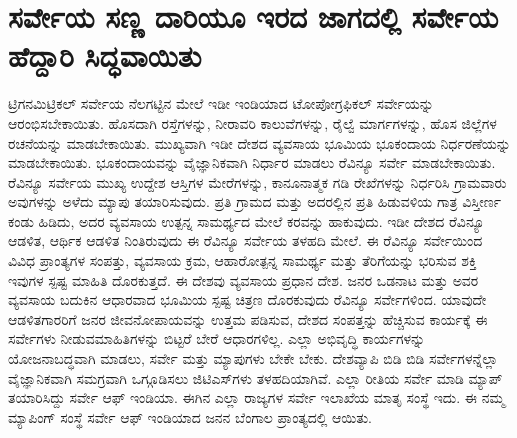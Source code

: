 
\chapter{ಸರ್ವೇಯ ಸಣ್ಣ ದಾರಿಯೂ ಇರದ ಜಾಗದಲ್ಲಿ ಸರ್ವೇಯ ಹೆದ್ದಾರಿ ಸಿದ್ಧವಾಯಿತು}

ಟ್ರಿಗನಮಿಟ್ರಿಕಲ್​ ಸರ್ವೇಯ ನೆಲಗಟ್ಟಿನ ಮೇಲೆ ಇಡೀ ಇಂಡಿಯಾದ ಟೋಪೋಗ್ರಫಿಕಲ್​ ಸರ್ವೇಯನ್ನು ಆರಂಭಿಸಬೇಕಾಯಿತು. ಹೊಸದಾಗಿ ರಸ್ತೆಗಳನ್ನು, ನೀರಾವರಿ ಕಾಲುವೆಗಳನ್ನು, ರೈಲ್ವೆ ಮಾರ್ಗಗಳನ್ನು, ಹೊಸ ಜಿಲ್ಲೆಗಳ ರಚನೆಯನ್ನು ಮಾಡಬೇಕಾಯಿತು. ಮುಖ್ಯವಾಗಿ ಇಡೀ ದೇಶದ ವ್ಯವಸಾಯ ಭೂಮಿಯ ಭೂಕಂದಾಯ ನಿರ್ಧರಣೆಯನ್ನು ಮಾಡಬೇಕಾಯಿತು. ಭೂಕಂದಾಯವನ್ನು ವೈಜ್ಞಾನಿಕವಾಗಿ ನಿರ್ಧಾರ ಮಾಡಲು ರೆವಿನ್ಯೂ ಸರ್ವೇ ಮಾಡಬೇಕಾಯಿತು. ರೆವಿನ್ಯೂ ಸರ್ವೇಯ ಮುಖ್ಯ ಉದ್ದೇಶ ಆಸ್ತಿಗಳ ಮೇರೆಗಳನ್ನು, ಕಾನೂನಾತ್ಮಕ ಗಡಿ ರೇಖೆಗಳನ್ನು ನಿರ್ಧರಿಸಿ ಗ್ರಾಮವಾರು ಅವುಗಳನ್ನು ಅಳೆದು ಮ್ಯಾಪು ತಯಾರಿಸುವುದು. ಪ್ರತಿ ಗ್ರಾಮದ ಮತ್ತು ಅದರಲ್ಲಿನ ಪ್ರತಿ ಹಿಡುವಳಿಯ ಗಾತ್ರ ವಿಸ್ತೀರ್ಣ ಕಂಡು ಹಿಡಿದು, ಅದರ ವ್ಯವಸಾಯ ಉತ್ಪನ್ನ ಸಾಮರ್ಥ್ಯದ ಮೇಲೆ ಕರವನ್ನು ಹಾಕುವುದು. ಇಡೀ ದೇಶದ ರೆವಿನ್ಯೂ ಆಡಳಿತ, ಆರ್ಥಿಕ ಆಡಳಿತ ನಿಂತಿರುವುದು ಈ ರೆವಿನ್ಯೂ ಸರ್ವೇಯ ತಳಹದಿ ಮೇಲೆ. ಈ ರೆವಿನ್ಯೂ ಸರ್ವೇಯಿಂದ ವಿವಿಧ ಪ್ರಾಂತ್ಯಗಳ ಸಂಪತ್ತು, ವ್ಯವಸಾಯ ಕ್ರಮ, ಆಹಾರೋತ್ಪನ್ನ ಸಾಮರ್ಥ್ಯ ಮತ್ತು ತೆರಿಗೆಯನ್ನು ಭರಿಸುವ ಶಕ್ತಿ ಇವುಗಳ ಸ್ಪಷ್ಟ ಮಾಹಿತಿ ದೊರಕುತ್ತದೆ. ಈ ದೇಶವು ವ್ಯವಸಾಯ ಪ್ರಧಾನ ದೇಶ. ಜನರ ಒಡನಾಟ ಮತ್ತು ಅವರ ವ್ಯವಸಾಯ ಬದುಕಿನ ಆಧಾರವಾದ ಭೂಮಿಯ ಸ್ಪಷ್ಟ ಚಿತ್ರಣ ದೊರಕುವುದು ರೆವಿನ್ಯೂ ಸರ್ವೇಗಳಿಂದ. ಯಾವುದೇ ಆಡಳಿತಗಾರರಿಗೆ ಜನರ ಜೀವನೋಪಾಯವನ್ನು ಉತ್ತಮ ಪಡಿಸುವ, ದೇಶದ ಸಂಪತ್ತನ್ನು ಹೆಚ್ಚಿಸುವ ಕಾರ್ಯಕ್ಕೆ ಈ ಸರ್ವೇಗಳು ನೀಡುವ\break ಮಾಹಿತಿಗಳನ್ನು ಬಿಟ್ಟರೆ ಬೇರೆ ಆಧಾರಗಳಿಲ್ಲ. ಎಲ್ಲಾ ಅಭಿವೃದ್ಧಿ ಕಾರ್ಯಗಳನ್ನು ಯೋಜನಾಬದ್ಧವಾಗಿ ಮಾಡಲು, ಸರ್ವೇ ಮತ್ತು ಮ್ಯಾಪುಗಳು ಬೇಕೇ ಬೇಕು. ದೇಶವ್ಯಾಪಿ ಬಿಡಿ ಬಿಡಿ ಸರ್ವೇಗಳನ್ನೆಲ್ಲಾ ವೈಜ್ಞಾನಿಕವಾಗಿ ಸಮಗ್ರವಾಗಿ ಒಗ್ಗೂಡಿಸಲು ಜಿಟಿಎಸ್​ಗಳು ತಳಹದಿಯಾಗಿವೆ. ಎಲ್ಲಾ ರೀತಿಯ ಸರ್ವೇ ಮಾಡಿ ಮ್ಯಾಪ್​ ತಯಾರಿಸಿದ್ದು ಸರ್ವೇ ಆಫ್​ ಇಂಡಿಯಾ. ಈಗಿನ ಎಲ್ಲಾ ರಾಜ್ಯಗಳ ಸರ್ವೇ ಇಲಾಖೆಯ ಮಾತೃ ಸಂಸ್ಥೆ ಇದು. ಈ ನಮ್ಮ ಮ್ಯಾಪಿಂಗ್​ ಸಂಸ್ಥೆ ಸರ್ವೇ ಆಫ್​ ಇಂಡಿಯಾದ ಜನನ ಬೆಂಗಾಲ ಪ್ರಾಂತ್ಯದಲ್ಲಿ ಆಯಿತು.

\vskip 3pt

